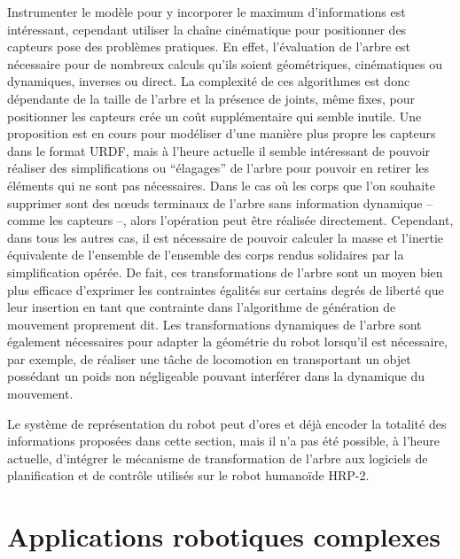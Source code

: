Instrumenter le modèle pour y incorporer le maximum d'informations est
intéressant, cependant utiliser la chaîne cinématique pour positionner
des capteurs pose des problèmes pratiques. En effet, l'évaluation de
l'arbre est nécessaire pour de nombreux calculs qu'ils soient
géométriques, cinématiques ou dynamiques, inverses ou direct. La
complexité de ces algorithmes est donc dépendante de la taille de
l'arbre et la présence de joints, même fixes, pour positionner les
capteurs crée un coût supplémentaire qui semble inutile. Une
proposition est en cours pour modéliser d'une manière plus propre les
capteurs dans le format URDF, mais à l'heure actuelle il semble
intéressant de pouvoir réaliser des simplifications ou ``élagages'' de
l'arbre pour pouvoir en retirer les éléments qui ne sont pas
nécessaires. Dans le cas où les corps que l'on souhaite supprimer sont
des n\oe uds terminaux de l'arbre sans information dynamique -- comme
les capteurs --, alors l'opération peut être réalisée
directement. Cependant, dans tous les autres cas, il est nécessaire de
pouvoir calculer la masse et l'inertie équivalente de l'ensemble de
l'ensemble des corps rendus solidaires par la simplification
opérée. De fait, ces transformations de l'arbre sont un moyen bien
plus efficace d'exprimer les contraintes égalités sur certains degrés
de liberté que leur insertion en tant que contrainte dans l'algorithme
de génération de mouvement proprement dit. Les transformations
dynamiques de l'arbre sont également nécessaires pour adapter la
géométrie du robot lorsqu'il est nécessaire, par exemple, de réaliser
une tâche de locomotion en transportant un objet possédant un poids
non négligeable pouvant interférer dans la dynamique du mouvement.

Le système de représentation du robot peut d'ores et déjà encoder la
totalité des informations proposées dans cette section, mais il n'a
pas été possible, à l'heure actuelle, d'intégrer le mécanisme de
transformation de l'arbre aux logiciels de planification et de
contrôle utilisés sur le robot humanoïde HRP-2.


\section{Applications robotiques complexes}


